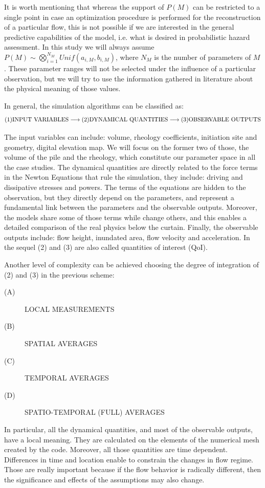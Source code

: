 \documentclass{article}
\begin{document}
It is worth mentioning that whereas the support of $P(M)$ can be restricted to a single point in case an optimization procedure is performed for the reconstruction of a particular flow, this is not possible if we are interested in the general predictive capabilities of the model, i.e. what is desired in probabilistic hazard assessment. In this study we will always assume $P(M)\sim \bigotimes_{i=1}^{N_M} Unif(a_{i,M},b_{i,M})$, where $N_M$ is the number of parameters of $M$. These parameter ranges will not be selected under the influence of a particular observation, but we will try to use the information gathered in literature about the physical meaning of those values.

In general, the simulation algorithms can be classified as:
$$\textmd{(1)INPUT VARIABLES} \longrightarrow \textmd{(2)DYNAMICAL QUANTITIES} \longrightarrow \textmd{(3)OBSERVABLE OUTPUTS}$$

The input variables can include: volume, rheology coefficients, initiation site and geometry, digital elevation map. We will focus on the former two of those, the volume of the pile and the rheology, which constitute our parameter space in all the case studies. The dynamical quantities are directly related to the force terms in the Newton Equations that rule the simulation, they include: driving and dissipative stresses and powers. The terms of the equations are hidden to the observation, but they directly depend on the parameters, and represent a fundamental link between the parameters and the observable outputs. Moreover, the models share some of those terms while change others, and this enables a detailed comparison of the real physics below the curtain. Finally, the observable outputs include: flow height, inundated area, flow velocity and acceleration. In the sequel (2) and (3) are also called quantities of interest (QoI).

Another level of complexity can be achieved choosing the degree of integration of (2) and (3) in the previous scheme:
\begin{description}
  \item[(A)] LOCAL MEASUREMENTS
  \item[(B)] SPATIAL AVERAGES
  \item[(C)] TEMPORAL AVERAGES
  \item[(D)] SPATIO-TEMPORAL (FULL) AVERAGES
\end{description}

In particular, all the dynamical quantities, and most of the observable outputs, have a local meaning. They are calculated on the elements of the numerical mesh created by the code. Moreover, all those quantities are time dependent. Differences in time and location enable to constrain the changes in flow regime. Those are really important because if the flow behavior is radically different, then the significance and effects of the assumptions may also change.
\end{document}
